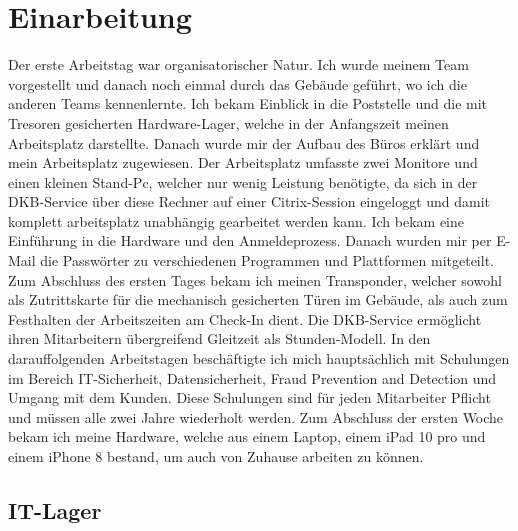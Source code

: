 \section{Einarbeitung}
\label{sec:Einarbeitung}

Der erste Arbeitstag war organisatorischer Natur. Ich wurde meinem Team vorgestellt und danach noch einmal durch das Gebäude geführt, wo ich die anderen Teams kennenlernte. Ich bekam Einblick in die Poststelle und die mit Tresoren gesicherten Hardware-Lager, welche in der Anfangszeit meinen Arbeitsplatz darstellte. Danach wurde mir der Aufbau des Büros erklärt und mein Arbeitsplatz zugewiesen. Der Arbeitsplatz umfasste zwei Monitore und einen kleinen Stand-Pc, welcher nur wenig Leistung benötigte, da sich in der DKB-Service über diese Rechner auf einer Citrix-Session eingeloggt und damit komplett arbeitsplatz unabhängig gearbeitet werden kann. Ich bekam eine Einführung in die Hardware und den Anmeldeprozess. Danach wurden mir per E-Mail die Passwörter zu verschiedenen Programmen und Plattformen mitgeteilt. Zum Abschluss des ersten Tages bekam ich meinen Transponder, welcher sowohl als Zutrittskarte für die mechanisch gesicherten Türen im Gebäude, als auch zum Festhalten der Arbeitszeiten am Check-In dient. Die DKB-Service ermöglicht ihren Mitarbeitern übergreifend Gleitzeit als Stunden-Modell. In den darauffolgenden Arbeitstagen beschäftigte ich mich hauptsächlich mit Schulungen im Bereich IT-Sicherheit, Datensicherheit, Fraud Prevention and Detection und Umgang mit dem Kunden. Diese Schulungen sind für jeden Mitarbeiter Pflicht und müssen alle zwei Jahre wiederholt werden. Zum Abschluss der ersten Woche bekam ich meine Hardware, welche aus einem Laptop, einem iPad 10 pro und einem iPhone 8 bestand, um auch von Zuhause arbeiten zu können. 

\subsection{IT-Lager}
\label{sec:IT-Lager}

